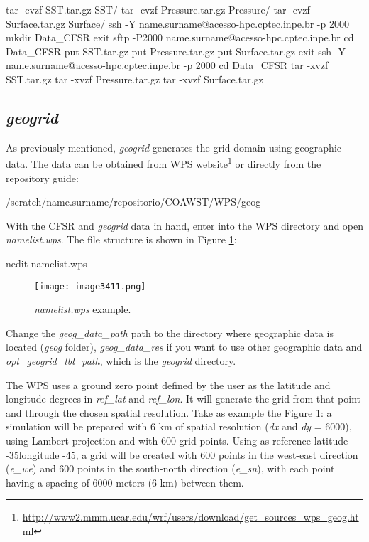 \begin{bashcode}
tar -cvzf SST.tar.gz SST/
tar -cvzf Pressure.tar.gz Pressure/
tar -cvzf Surface.tar.gz Surface/
ssh -Y name.surname@acesso-hpc.cptec.inpe.br -p 2000
mkdir Data_CFSR
exit
sftp -P2000 name.surname@acesso-hpc.cptec.inpe.br
cd Data_CFSR
put SST.tar.gz
put Pressure.tar.gz
put Surface.tar.gz
exit
ssh -Y name.surname@acesso-hpc.cptec.inpe.br -p 2000
cd Data_CFSR
tar -xvzf SST.tar.gz
tar -xvzf Pressure.tar.gz
tar -xvzf Surface.tar.gz
\end{bashcode}
\bigskip

\subsection{\textit{geogrid}}\label{geowps}
\bigskip

 As previously mentioned, \textit{geogrid} generates the grid domain using geographic data. The data can be obtained from WPS 
website\textcolor{bleu_cite}{\textit{}\footnote{\textcolor{bleu_cite}{\href{http://www2.mmm.ucar.edu/wrf/users/download/get\_sources\_wps\_geog.html}{http://www2.mmm.ucar.edu/wrf/users/download/get\_sources\_wps\_geog.html}}}}
 or directly from the repository guide:
\bigskip

\begin{bashcode}
/scratch/name.surname/repositorio/COAWST/WPS/geog
\end{bashcode}
\bigskip

 With the CFSR and \textit{geogrid} data in hand, enter into the WPS directory and open \textit{namelist.wps}. 
The file structure is shown in Figure \textcolor{bleu_cite}{\ref{namelistwps}}:
\bigskip

\begin{bashcode}
nedit namelist.wps
\end{bashcode}
\bigskip

\begin{figure}[H]
    \centering
    \texttt{[image: image3411.png]}
    \caption{\textit{namelist.wps} example.}
    \label{namelistwps}
\end{figure}
\bigskip

 Change the \textit{geog\_data\_path} path to the directory where geographic data is located (\textit{geog} folder), 
\textit{geog\_data\_res} if you want to use other geographic data and \textit{opt\_geogrid\_tbl\_path}, which is the 
\textit{geogrid} directory.

\bigskip

 The WPS uses a ground zero point defined by the user as the latitude and longitude degrees in \textit{ref\_lat} and \textit{ref\_lon}.
It will generate the grid from that point and through the chosen spatial resolution. Take as example the Figure
\textcolor{bleu_cite}{\ref{namelistwps}}: a simulation will be prepared with 6 km of spatial resolution (\textit{dx} and \textit{dy} = 6000),
using Lambert projection and with 600 grid points. Using as reference latitude -35\degree longitude -45\degree, a grid will be created with 
600 points in the west-east direction (\textit{e\_we}) and 600 points in the south-north direction (\textit{e\_sn}), with each
point having a spacing of 6000 meters (6 km) between them.
\bigskip

